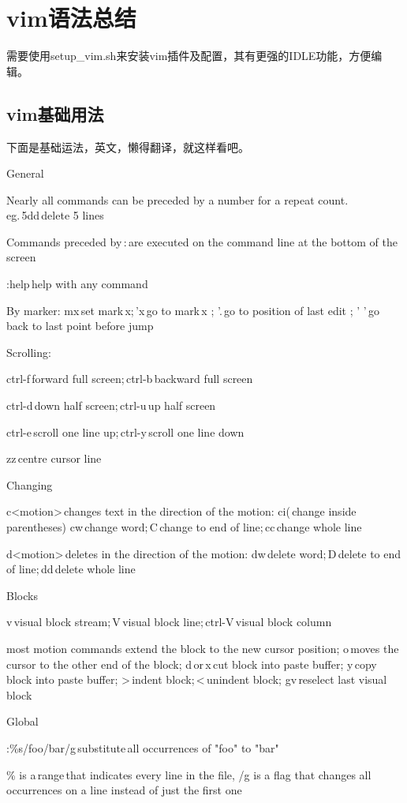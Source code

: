 \chapter{vim语法总结}

需要使用setup_vim.sh来安装vim插件及配置，其有更强的IDLE功能，方便编辑。

\section{vim基础用法}
下面是基础运法，英文，懒得翻译，就这样看吧。

General 

Nearly all commands can be preceded by a number for a repeat count. eg. 5dd delete 5 lines 

Commands preceded by : are executed on the command line at the bottom of the screen 

:help help with any command 

By marker:  mx set mark x; 'x go to mark x ; '. go to position of last edit ;  ' ' go back to last point before jump 

Scrolling: 

ctrl-f forward full screen; ctrl-b backward full screen 

ctrl-d down half screen; ctrl-u up half screen 

ctrl-e scroll one line up; ctrl-y scroll one line down 

zz centre cursor line 


Changing 

c<motion> changes text in the direction of the motion: ci( change inside parentheses) cw change word; C change to end of line; cc change whole line 

d<motion> deletes in the direction of the motion: dw delete word; D delete to end of line; dd delete whole line 

Blocks 

v visual block stream; V visual block line; ctrl-V visual block column 

most motion commands extend the block to the new cursor position; o moves the cursor to the other end of the block; d or x cut block into paste buffer; y copy block into paste buffer; > indent block; < unindent block; gv reselect last visual block 

Global 

:\%s/foo/bar/g substitute all occurrences of "foo" to "bar" 

\% is a range that indicates every line in the file, /g is a flag that changes all occurrences on a line instead of just the first one 

